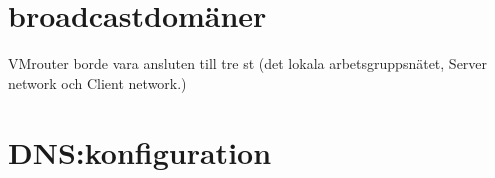 \documentclass[swedish,10pt,a4paper]{article}
\begin{document}



\section{broadcastdomäner}
\label{sec:broadcastdomains}

VMrouter borde vara ansluten till tre st (det lokala arbetsgruppsnätet, Server network och Client network.)

\section{DNS:konfiguration}
\label{sec:dns_konf}




\end{document}

